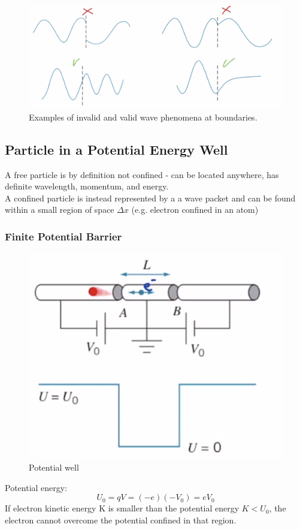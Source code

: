 \documentclass[class=article,crop=false]{standalone}
\begin{document}
\begin{figure}[h!]
	\centering
	\includegraphics[width=.9\linewidth]{./Images/boundary-waves.png}
	\caption{Examples of invalid and valid wave phenomena at boundaries.}
\end{figure}

\subsection{Particle in a Potential Energy Well}

A free particle is by definition not confined - can be located anywhere, has definite wavelength, momentum, and energy.\\
A confined particle is instead represented by a a wave packet and can be found within a small region of space $\Delta x$ (e.g. electron confined in an atom)\\

\subsubsection{Finite Potential Barrier}

\begin{figure}[h!]
	\centering
	\includegraphics[width=.4\linewidth]{./Images/potential_well.png}
	\caption{Potential well}
\end{figure}

Potential energy:
$$ U_0 = qV = (-e)(-V_0) = eV_0 $$
If electron kinetic energy K is smaller than the potential energy $K < U_0$, the electron cannot overcome the potential confined in that region.
\newpage
\end{document}
